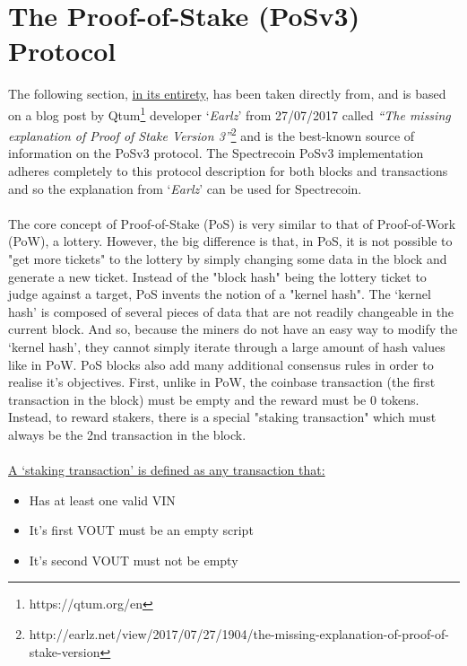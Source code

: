\section{The Proof-of-Stake (PoSv3) Protocol}
The following section, \underline{in its entirety}, has been taken
directly from, and is based on a blog post by
Qtum\footnote{https://qtum.org/en} developer ‘\textit{Earlz}’
from 27/07/2017 called \textit{“The missing explanation of Proof
of Stake Version 3”}\footnote{http://earlz.net/view/2017/07/27/1904/the-missing-explanation-of-proof-of-stake-version}
and is the best-known source of information on the PoSv3 protocol.
The Spectrecoin PoSv3 implementation adheres completely to this protocol
description for both blocks and transactions and so the explanation from
‘\textit{Earlz}’ can be used for Spectrecoin.
\\
\\
\noindent
The core concept of Proof-of-Stake (PoS) is very similar to that of
Proof-of-Work (PoW), a lottery. However, the big difference is that,
in PoS, it is not possible to "get more tickets" to the lottery by
simply changing some data in the block and generate a new ticket.
Instead of the "block hash" being the lottery ticket to judge against
a target, PoS invents the notion of a "kernel hash". The ‘kernel hash’
is composed of several pieces of data that are not readily changeable
in the current block. And so, because the miners do not have an easy
way to modify the ‘kernel hash’, they cannot simply iterate through a
large amount of hash values like in PoW. PoS blocks also add many
additional consensus rules in order to realise it's objectives. First,
unlike in PoW, the coinbase transaction (the first transaction in the
block) must be empty and the reward must be 0 tokens. Instead, to reward
stakers, there is a special "staking transaction" which must always be
the 2nd transaction in the block.
\\
\\
\noindent
\underline{A ‘staking transaction’ is defined as
any transaction that:}


\begin{itemize}
	\item Has at least one valid VIN
	\item It's first VOUT must be an empty script
	\item It's second VOUT must not be empty
\end{itemize}

